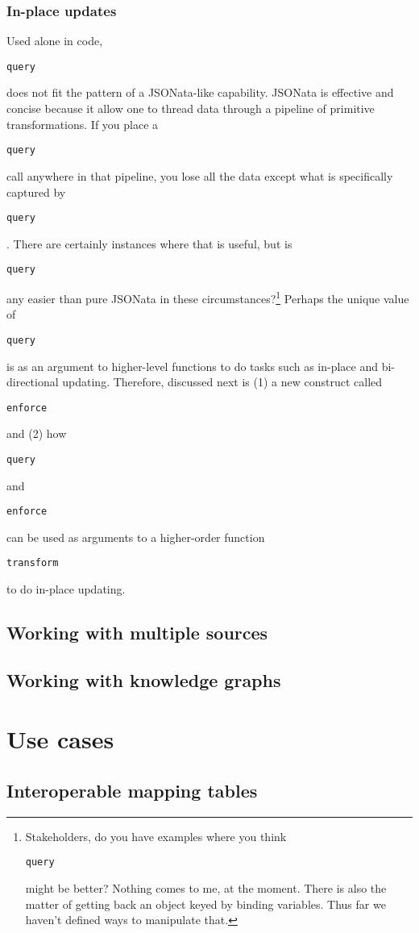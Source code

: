 \documentclass[9pt,letterpaper]{article}
\newcommand{\stt}[1]{\begin{footnotesize}\texttt{#1}\end{footnotesize}}
\begin{document}
\subsubsection{In-place updates}

Used alone in code, \stt{query} does not fit the pattern of a JSONata-like capability.
JSONata is effective and concise because it allow one to thread data through a pipeline of primitive transformations.
If you place a \stt{query} call anywhere in that pipeline, you lose all the data except what is specifically captured by \stt{query}.
There are certainly instances where that is useful, but is \stt{query} any easier than pure JSONata in these circumstances?\footnote{Stakeholders, do you have 
  examples where you think \stt{query} might be better?
  Nothing comes to me, at the moment.
  There is also the matter of getting back an object keyed by binding variables.
  Thus far we haven't defined ways to manipulate that.}
Perhaps the unique value of \stt{query} is as an argument to higher-level functions to do tasks such as in-place and bi-directional updating.
Therefore, discussed next is (1) a new construct called \stt{enforce} and (2) how \stt{query} and \stt{enforce} can be used as arguments to a higher-order function \stt{transform} to do in-place updating.

\subsection{Working with multiple sources}

\subsection{Working with knowledge graphs}



\section{Use cases}

\subsection{Interoperable mapping tables}
\end{document}
